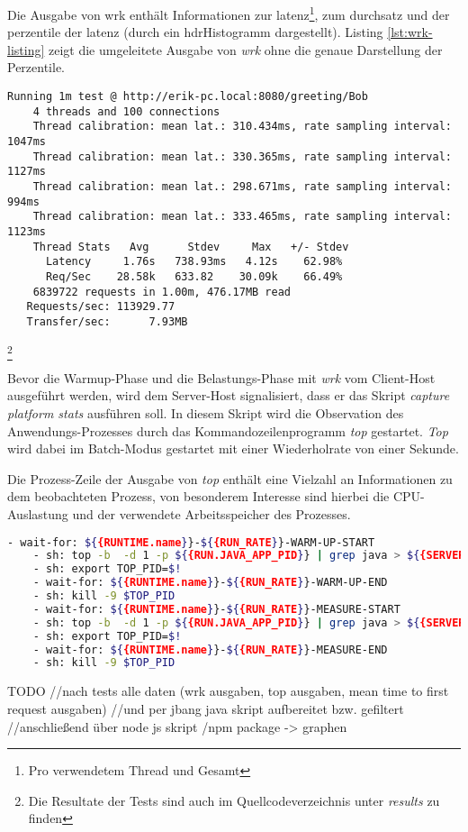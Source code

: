    Die Ausgabe von wrk enthält Informationen zur \Gls{latenz}\footnote{Pro verwendetem Thread und Gesamt},
   zum \Gls{durchsatz} und der \Gls{perzentile} der \Gls{latenz} (durch ein \Gls{hdrHistogramm} dargestellt).
   Listing \ref*{lst:wrk-listing} zeigt die umgeleitete Ausgabe von \textit{wrk} ohne die genaue Darstellung der Perzentile.
 
   \begin{lstlisting}[caption=Beispiel für Ausgabe von wrk,captionpos=b, label=lst:wrk-listing]
    Running 1m test @ http://erik-pc.local:8080/greeting/Bob
    4 threads and 100 connections
    Thread calibration: mean lat.: 310.434ms, rate sampling interval: 1047ms
    Thread calibration: mean lat.: 330.365ms, rate sampling interval: 1127ms
    Thread calibration: mean lat.: 298.671ms, rate sampling interval: 994ms
    Thread calibration: mean lat.: 333.465ms, rate sampling interval: 1123ms
    Thread Stats   Avg      Stdev     Max   +/- Stdev
      Latency     1.76s   738.93ms   4.12s    62.98%
      Req/Sec    28.58k   633.82    30.09k    66.49%
    6839722 requests in 1.00m, 476.17MB read
   Requests/sec: 113929.77
   Transfer/sec:      7.93MB
   \end{lstlisting}\footnote{Die Resultate der Tests sind auch im Quellcodeverzeichnis unter \textit{\/results} zu finden}

  Bevor die Warmup-Phase und die Belastungs-Phase mit \textit{wrk} vom Client-Host ausgeführt werden, wird dem Server-Host signalisiert, dass
  er das Skript \textit{capture platform stats} ausführen soll.
  In diesem Skript wird die Observation des Anwendungs-Prozesses durch das Kommandozeilenprogramm \textit{top} gestartet.
  \textit{Top} wird dabei im Batch-Modus gestartet mit einer Wiederholrate von einer Sekunde.

  Die Prozess-Zeile der Ausgabe von \textit{top} enthält eine Vielzahl an Informationen zu dem beobachteten Prozess, von besonderem
  Interesse sind hierbei die CPU-Auslastung und der verwendete Arbeitsspeicher des Prozesses.

  \begin{lstlisting}[language=sh, caption=Auszug des qDup Skripts capture-platform-stats, captionpos=b]
    - wait-for: ${{RUNTIME.name}}-${{RUN_RATE}}-WARM-UP-START
    - sh: top -b  -d 1 -p ${{RUN.JAVA_APP_PID}} | grep java > ${{SERVER_FILE_PATH}}/output/${{RUNTIME.name}}-${{RUN_RATE}}-WARM-UP-top.out &
    - sh: export TOP_PID=$!
    - wait-for: ${{RUNTIME.name}}-${{RUN_RATE}}-WARM-UP-END
    - sh: kill -9 $TOP_PID
    - wait-for: ${{RUNTIME.name}}-${{RUN_RATE}}-MEASURE-START
    - sh: top -b  -d 1 -p ${{RUN.JAVA_APP_PID}} | grep java > ${{SERVER_FILE_PATH}}/output/${{RUNTIME.name}}-${{RUN_RATE}}-MEASURE-top.out &
    - sh: export TOP_PID=$!
    - wait-for: ${{RUNTIME.name}}-${{RUN_RATE}}-MEASURE-END
    - sh: kill -9 $TOP_PID
  \end{lstlisting}
  TODO
  //nach tests alle daten (wrk ausgaben, top ausgaben, mean time to first request ausgaben)
  //und per jbang java skript aufbereitet bzw. gefiltert
  //anschließend über node js skript /npm package -> graphen
 
